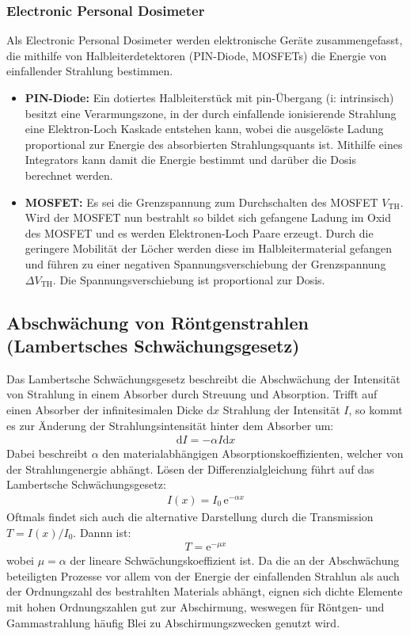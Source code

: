 \documentclass[11pt, a4paper]{article}
\numberwithin{equation}{section}
\begin{document}
\subsubsection{Electronic Personal Dosimeter}
Als Electronic Personal Dosimeter werden elektronische Geräte zusammengefasst, die mithilfe von Halbleiterdetektoren (PIN-Diode, MOSFETs) die Energie von einfallender Strahlung bestimmen.
\begin{itemize}
	\item \textbf{PIN-Diode:} Ein dotiertes Halbleiterstück mit pin-Übergang (i: intrinsisch) besitzt eine Verarmungszone, in der durch einfallende ionisierende Strahlung eine Elektron-Loch Kaskade entstehen kann, wobei die ausgelöste Ladung proportional zur Energie des absorbierten Strahlungsquants ist.
	Mithilfe eines Integrators kann damit die Energie bestimmt und darüber die Dosis berechnet werden.
	\item \textbf{MOSFET:} Es sei die Grenzspannung zum Durchschalten des MOSFET $V_\mathrm{TH}$.
	Wird der MOSFET nun bestrahlt so bildet sich gefangene Ladung im Oxid des MOSFET und es werden Elektronen-Loch Paare erzeugt.
	Durch die geringere Mobilität der Löcher werden diese im Halbleitermaterial gefangen und führen zu einer negativen Spannungsverschiebung der Grenzspannung $\Delta V_\mathrm{TH}$.
	Die Spannungsverschiebung ist proportional zur Dosis.
\end{itemize}

\subsection{Abschwächung von Röntgenstrahlen (Lambertsches Schwächungsgesetz)}
\label{sec:lambert}
Das Lambertsche Schwächungsgesetz beschreibt die Abschwächung der Intensität von Strahlung in einem Absorber durch Streuung und Absorption.
Trifft auf einen Absorber der infinitesimalen Dicke $\mathrm{d}x$ Strahlung der Intensität $I$, so kommt es zur Änderung der Strahlungsintensität hinter dem Absorber um:
\begin{align}
	\mathrm{d} I = - \alpha I \mathrm{d} x
\end{align}
Dabei beschreibt $\alpha$ den materialabhängigen Absorptionskoeffizienten, welcher von der Strahlungenergie abhängt.
Lösen der Differenzialgleichung führt auf das Lambertsche Schwächungsgesetz:
\begin{align}
	I(x) = I_0 \, \mathrm{e}^{-\alpha x}
	\label{eq:schwächung}
\end{align}
Oftmals findet sich auch die alternative Darstellung durch die Transmission $T = I(x)/I_0$. 
Dannn ist:
\begin{align}
	T = \mathrm{e}^{-\mu x}
\end{align}
wobei $\mu = \alpha$ der lineare Schwächungskoeffizient ist.
Da die an der Abschwächung beteiligten Prozesse vor allem von der Energie der einfallenden Strahlun als auch der Ordnungszahl des bestrahlten Materials abhängt, eignen sich dichte Elemente mit hohen Ordnungszahlen gut zur Abschirmung, weswegen für Röntgen- und Gammastrahlung häufig Blei zu Abschirmungszwecken genutzt wird.
\end{document}
